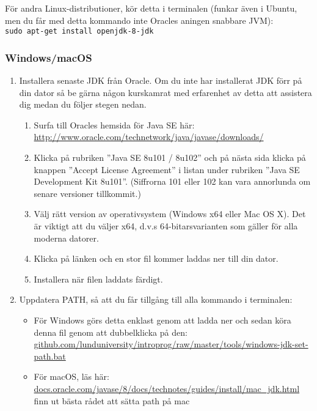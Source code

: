 För andra Linux-distributioner, kör detta i terminalen (funkar även i Ubuntu, men du får med detta kommando inte Oracles aningen snabbare JVM): \\ \texttt{sudo apt-get install openjdk-8-jdk}

\subsubsection{Windows/macOS}

\begin{enumerate}
\item Installera senaste JDK från Oracle. Om du inte har installerat JDK förr på din dator så be gärna någon kurskamrat med erfarenhet av detta att assistera dig medan du följer stegen nedan. 

\begin{enumerate}
\item Surfa till Oracles hemsida för Java SE här: \\ \url{http://www.oracle.com/technetwork/java/javase/downloads/}

\item Klicka på rubriken ''Java SE 8u101 / 8u102'' och på nästa sida klicka på knappen ''Accept License Agreement'' i listan under rubriken ''Java SE Development Kit 8u101''. (Siffrorna 101 eller 102 kan vara annorlunda om senare versioner tillkommit.)

\item Välj rätt version av operativsystem (Windows x64 eller Mac OS X). Det är viktigt att du väljer x64, d.v.s 64-bitarsvarianten som gäller för alla moderna datorer.

\item Klicka på länken och en stor fil kommer laddas ner till din dator.

\item Installera när filen laddats färdigt. 

\end{enumerate}

\item Uppdatera PATH, så att du får tillgång till alla kommando i terminalen:
\begin{itemize}
\item För Windows görs detta enklast genom att ladda ner och sedan köra denna fil genom att dubbelklicka på den: \\ \mbox{\href{https://github.com/lunduniversity/introprog/raw/master/tools/windows-jdk-set-path.bat}{github.com/lunduniversity/introprog/raw/master/tools/windows-jdk-set-path.bat}}
\item För macOS, läs här: \\ \href{https://docs.oracle.com/javase/8/docs/technotes/guides/install/mac_jdk.html}{docs.oracle.com/javase/8/docs/technotes/guides/install/mac\_jdk.html} 
\\ \TODO finn ut bästa rådet att sätta path på mac


\end{itemize}
\end{enumerate}
